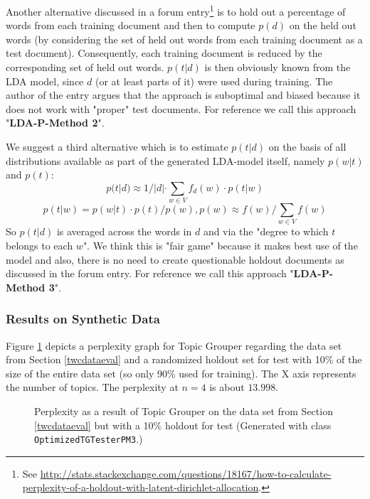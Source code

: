 \documentclass[10pt, a4paper, oneside]{article}
\begin{document}
Another alternative discussed in a forum entry\footnote{See \href{http://stats.stackexchange.com/questions/18167/how-to-calculate-perplexity-of-a-holdout-with-latent-dirichlet-allocation}{{http://stats.stackexchange.com/questions/18167/how-to-calculate-perplexity-of-a-holdout-with-latent-dirichlet-allocation}}.} is to hold out a percentage of words from each training document and then to compute $p(d)$ on the held out words (by considering the set of held out words from each training document as a test document). Consequently, each training document is reduced by the corresponding set of held out words. $p(t|d)$ is then obviously known from the LDA model, since $d$ (or at least parts of it) were used during training. The author of the entry argues that the approach is suboptimal and biased because it does not work with "proper" test documents. For reference we call this approach "\textbf{LDA-P-Method 2}".

We suggest a third alternative which is to estimate $p(t|d)$ on the basis of all distributions available as part of the generated LDA-model itself, namely
$p(w|t)$ and $p(t)$:
\[ p(t|d) \approx 1 / |d| \cdot \sum_{w \in V} f_d(w) \cdot p(t|w)\]
\[ p(t|w) = p(w|t) \cdot p(t) / p(w), p(w) \approx f(w) / \sum_{w \in V} f(w)\]
So $p(t|d)$ is averaged across the words in $d$ and via the "degree to which $t$ belongs to each $w$".
We think this is "fair game" because it makes best use of the model and also, there is no need to create questionable holdout documents as discussed in the forum entry. For reference we call this approach "\textbf{LDA-P-Method 3}".

\subsubsection{Results on Synthetic Data}

Figure \ref{perplexity1} depicts a perplexity graph for Topic Grouper regarding the data set from Section \ref{twcdataeval} and a randomized holdout set for test with 10\% of the size of the entire data set (so only 90\% used for training). The X axis represents the number of topics.
The perplexity at $n = 4$ is about $13.998$.

\begin{figure}
\caption{Perplexity as a result of Topic Grouper on the data set from Section \ref{twcdataeval} but with a 10\% holdout for test (Generated with class \texttt{OptimizedTGTesterPM3}.)}
\label{perplexity1}
\end{figure}
\end{document}
